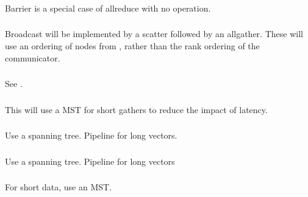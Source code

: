 \documentclass{article}
\begin{document}
\subsubsection{}
Barrier is a special case of allreduce with no operation.

\subsubsection{}
Broadcast will be implemented by a scatter followed by an allgather.  These
will use an ordering of nodes from , rather than
the rank ordering of the communicator.

\subsubsection{}
See .

\subsubsection{}
This will use a MST for short gathers to reduce the impact of latency.  

\subsubsection{}

\subsubsection{}
Use a spanning tree.  Pipeline for long vectors.

\subsubsection{}

\subsubsection{}
Use a spanning tree.  Pipeline for long vectors

\subsubsection{}
For short data, use an MST. 
\end{document}

